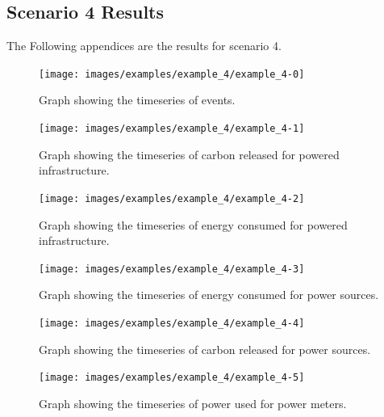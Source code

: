 \documentclass{l4proj}
\begin{document}
\begin{appendices}
\section{Scenario 4 Results}\label{apen:subsec:scen4}
The Following appendices are the results for scenario 4.
\clearpage
\begin{figure}[htbp]
    \centering
    \texttt{[image: images/examples/example\_4/example\_4-0]}
    ~
    \caption{Graph showing the timeseries of events.}
    \label{fig:example4-0}
\end{figure}
\clearpage
\begin{figure}[htbp]
    \centering
    \texttt{[image: images/examples/example\_4/example\_4-1]}
    ~
    \caption{Graph showing the timeseries of carbon released for powered infrastructure.}
    \label{fig:example4-1}
\end{figure}
\clearpage
\begin{figure}[htbp]
    \centering
    \texttt{[image: images/examples/example\_4/example\_4-2]}
    ~
    \caption{Graph showing the timeseries of energy consumed for powered infrastructure.}
    \label{fig:example4-2}
\end{figure}
\clearpage
\begin{figure}[htbp]
    \centering
    \texttt{[image: images/examples/example\_4/example\_4-3]}
    ~
    \caption{Graph showing the timeseries of energy consumed for power sources.}
    \label{fig:example4-3}
\end{figure}
\clearpage
\begin{figure}[htbp]
    \centering
    \texttt{[image: images/examples/example\_4/example\_4-4]}
    ~
    \caption{Graph showing the timeseries of carbon released for power sources.}
    \label{fig:example4-4}
\end{figure}
\clearpage
\begin{figure}[htbp]
    \centering
    \texttt{[image: images/examples/example\_4/example\_4-5]}
    ~
    \caption{Graph showing the timeseries of power used for power meters.}
    \label{fig:example4-5}
\end{figure}

\clearpage

\end{appendices}
\end{document}

